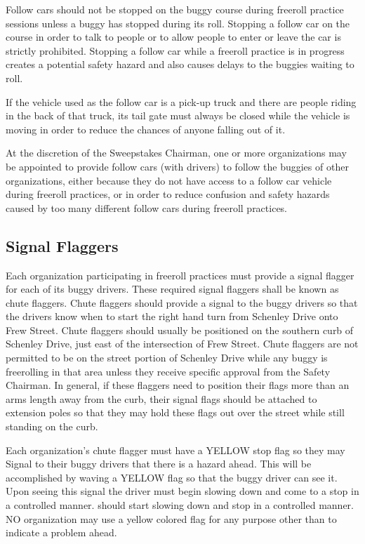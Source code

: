 	Follow cars should not be stopped on the buggy course during freeroll practice
	sessions unless a buggy has stopped during its roll. Stopping a follow car on
	the course in order to talk to people or to allow people to enter or leave the
	car is strictly prohibited. Stopping a follow car while a freeroll practice is
	in progress creates a potential safety hazard and also causes delays to the
	buggies waiting to roll.

	If the vehicle used as the follow car is a pick-up truck and there are people
	riding in the back of that truck, its tail gate must always be closed while the
	vehicle is moving in order to reduce the chances of anyone falling out of it.

	At the discretion of the Sweepstakes Chairman, one or more organizations may be
	appointed to provide follow cars (with drivers) to follow the buggies of other
	organizations, either because they do not have access to a follow car vehicle
	during freeroll practices, or in order to reduce confusion and safety hazards
	caused by too many different follow cars during freeroll practices.
 
\subsection{Signal Flaggers}

	Each organization participating in freeroll practices must provide a signal
	flagger for each of its buggy drivers. These required signal flaggers shall be
	known as chute flaggers. Chute flaggers should provide a signal to the buggy
	drivers so that the drivers know when to start the right hand turn from
	Schenley Drive onto Frew Street. Chute flaggers should usually be positioned on
	the southern curb of Schenley Drive, just east of the intersection of Frew
	Street. Chute flaggers are not permitted to be on the street portion of
	Schenley Drive while any buggy is freerolling in that area unless they receive
	specific approval from the Safety Chairman. In general, if these flaggers need
	to position their flags more than an arms length away from the curb, their
	signal flags should be attached to extension poles so that they may hold these
	flags out over the street while still standing on the curb.

	Each organization's chute flagger must have a YELLOW stop flag so they may
	Signal to their buggy drivers that there is a hazard ahead. This will be
	accomplished by waving a YELLOW flag so that the buggy driver can see it. Upon
	seeing this signal the driver must begin slowing down and come to a stop in a
	controlled manner.  should start slowing down and stop in a controlled manner.
	NO organization may use a yellow colored flag for any purpose other than to
	indicate a problem ahead.

